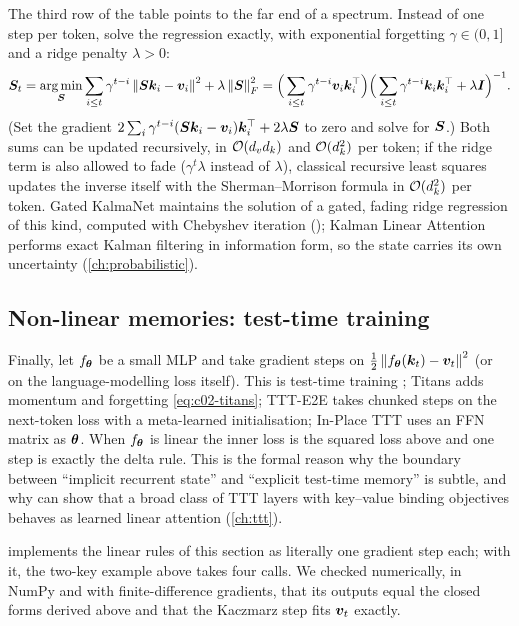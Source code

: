 The third row of the table points to the far end of a spectrum. Instead of one step per token,
solve the regression exactly, with exponential forgetting $\gamma \in (0,1]$ and a ridge penalty
$\lambda > 0$:
\begin{equation}\label{eq:c02-ridge}
  \bm{S}_t = \operatorname*{arg\,min}_{\bm{S}}\sum_{i\le t}\gamma^{t-i}\left\lVert \bm{S}\bm{k}_i - \bm{v}_i\right\rVert^2 + \lambda\left\lVert \bm{S}\right\rVert_F^2
        = \Big(\sum_{i\le t}\gamma^{t-i}\bm{v}_i\bm{k}_i^{\top}\Big)\Big(\sum_{i\le t}\gamma^{t-i}\bm{k}_i\bm{k}_i^{\top} + \lambda\bm{I}\Big)^{-1}.
\end{equation}
(Set the gradient $2\sum_i\gamma^{t-i}(\bm{S}\bm{k}_i - \bm{v}_i)\bm{k}_i^{\top} + 2\lambda\bm{S}$ to zero and solve
for $\bm{S}$.) Both sums can be updated recursively, in $\mathcal{O}(d_vd_k)$ and $\mathcal{O}(d_k^2)$ per token;
if the ridge term is also allowed to fade ($\gamma^t\lambda$ instead of $\lambda$), classical
recursive least squares updates the inverse itself with the Sherman--Morrison formula in
$\mathcal{O}(d_k^2)$ per token. Gated KalmaNet maintains the
solution of a gated, fading ridge regression of this kind, computed with Chebyshev iteration
(); Kalman Linear Attention performs exact Kalman
filtering in information form, so the state carries its own uncertainty (\cref{ch:probabilistic}).

\subsection{Non-linear memories: test-time training}

Finally, let $f_{\bm{\theta}}$ be a small MLP and take gradient steps on
$\tfrac12\left\lVert f_{\bm{\theta}}(\bm{k}_t) - \bm{v}_t\right\rVert^2$ (or on the language-modelling loss itself). This is
test-time training \citep{c02-sun2024ttt}; Titans adds momentum and forgetting
\eqref{eq:c02-titans}; TTT-E2E takes chunked steps on the next-token loss with a meta-learned
initialisation; In-Place TTT uses an FFN matrix as $\bm{\theta}$. When $f_{\bm{\theta}}$ is linear the
inner loss is the squared loss above and one step is exactly the delta rule. This is the formal
reason why the boundary between ``implicit recurrent state'' and ``explicit test-time memory'' is
subtle, and why \citet{liu2026tttla} can show that a broad class of TTT layers with key--value
binding objectives behaves as learned linear attention (\cref{ch:ttt}).

 implements the linear rules of this section as literally one gradient step
each; with it, the two-key example above takes four calls. We checked numerically, in NumPy and with
finite-difference gradients, that its outputs equal the closed forms derived above and that the
Kaczmarz step fits $\bm{v}_t$ exactly.

